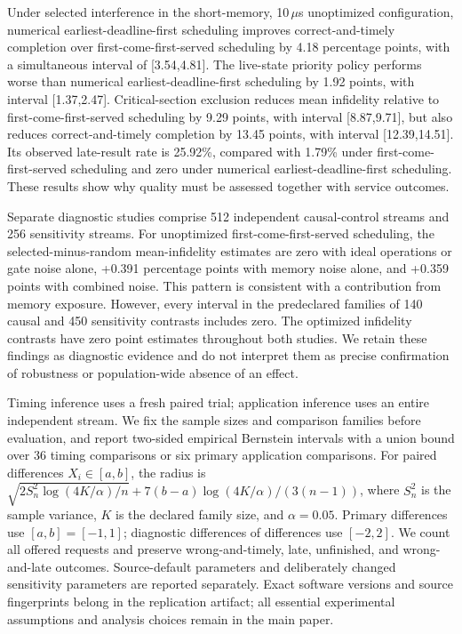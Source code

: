  Under selected interference in the short-memory, 10\,$\mu$s unoptimized configuration, numerical earliest-deadline-first scheduling improves correct-and-timely completion over first-come-first-served scheduling by 4.18 percentage points, with a simultaneous interval of [3.54,4.81]. The live-state priority policy performs worse than numerical earliest-deadline-first scheduling by 1.92 points, with interval [1.37,2.47]. Critical-section exclusion reduces mean infidelity relative to first-come-first-served scheduling by 9.29 points, with interval [8.87,9.71], but also reduces correct-and-timely completion by 13.45 points, with interval [12.39,14.51]. Its observed late-result rate is 25.92\%, compared with 1.79\% under first-come-first-served scheduling and zero under numerical earliest-deadline-first scheduling. These results show why quality must be assessed together with service outcomes.

 Separate diagnostic studies comprise 512 independent causal-control streams and 256 sensitivity streams. For unoptimized first-come-first-served scheduling, the selected-minus-random mean-infidelity estimates are zero with ideal operations or gate noise alone, +0.391 percentage points with memory noise alone, and +0.359 points with combined noise. This pattern is consistent with a contribution from memory exposure. However, every interval in the predeclared families of 140 causal and 450 sensitivity contrasts includes zero. The optimized infidelity contrasts have zero point estimates throughout both studies. We retain these findings as diagnostic evidence and do not interpret them as precise confirmation of robustness or population-wide absence of an effect.

 Timing inference uses a fresh paired trial; application inference uses an entire independent stream. We fix the sample sizes and comparison families before evaluation, and report two-sided empirical Bernstein intervals with a union bound over 36 timing comparisons or six primary application comparisons. For paired differences $X_i\in[a,b]$, the radius is $\sqrt{2S_n^2\log(4K/\alpha)/n}+7(b-a)\log(4K/\alpha)/(3(n-1))$, where $S_n^2$ is the sample variance, $K$ is the declared family size, and $\alpha=0.05$. Primary differences use $[a,b]=[-1,1]$; diagnostic differences of differences use $[-2,2]$. We count all offered requests and preserve wrong-and-timely, late, unfinished, and wrong-and-late outcomes. Source-default parameters and deliberately changed sensitivity parameters are reported separately. Exact software versions and source fingerprints belong in the replication artifact; all essential experimental assumptions and analysis choices remain in the main paper.

